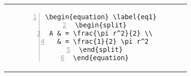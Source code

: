 \subsection{}
\begin{tabular}{l | c}
\begin{minipage}[m]{0.4\textwidth}
\enum{ \begin{equation} \label{eq1}
\begin{split}
A & = \frac{\pi r^2}{2} \\
 & = \frac{1}{2} \pi r^2
\end{split}
\end{equation} }{1.6}
\end{minipage}
& \begin{minipage}[m]{0.5\textwidth}
\renewcommand\textminus{\mbox{-}}%
\begin{lstlisting}[numberstyle=\zebra{black!5}{blue!15},numbers=left,basicstyle=\ttfamily\footnotesize] 
\begin{equation} \label{eq1}
\begin{split}
A & = \frac{\pi r^2}{2} \\
 & = \frac{1}{2} \pi r^2
\end{split}
\end{equation}
\end{lstlisting}
\end{minipage}
\end{tabular}

